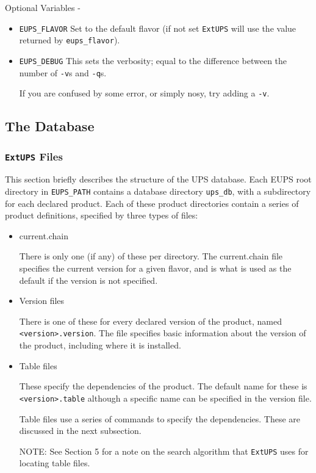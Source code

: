 \documentclass{article}
\newcommand{\code}[1]{\texttt{#1}}
\newcommand{\file}[1]{\texttt{#1}}
\newcommand{\eups}{\code{ExtUPS}}
\begin{document}
Optional Variables -

\begin{itemize}
  \item \code{EUPS\_FLAVOR}
    Set to the default flavor (if not set \eups{} will use the value returned
    by \code{eups\_flavor}).

  \item \code{EUPS\_DEBUG}
    This sets the verbosity; equal to the difference between the number of \code{-v}s
    and \code{-q}s.

    If you are confused by some error, or simply nosy, try adding a \code{-v}.
\end{itemize}

\subsection{The Database}

\subsubsection{\eups{} Files}

This section briefly describes the structure of the UPS database. Each
EUPS root directory in \code{EUPS\_PATH} contains a database directory
\code{ups\_db}, with a subdirectory for each declared product.  Each
of these product directories contain a series of product definitions,
specified by three types of files:

\begin{itemize}
  \item current.chain

    There is only one (if any) of these per directory.  The
    current.chain file specifies the current version for a given
    flavor, and is what is used as the default if the version is not
    specified.

  \item Version files

    There is one of these for every declared version of the product,
    named \file{<version>.version}. The file specifies basic information
    about the version of the product, including where it is installed.

  \item Table files

    These specify the dependencies of the product. The default name
    for these is \file{<version>.table} although a specific name can be specified in the
    version file.

    Table files use a series of commands to specify the dependencies. These are
    discussed in the next subsection.

    NOTE: See Section 5 for a note on the search algorithm that \eups{} uses for 
    locating table files.
\end{itemize}
\end{document}
